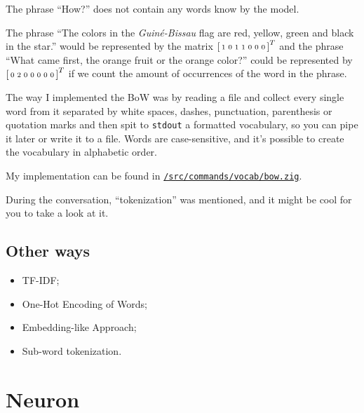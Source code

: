 \documentclass[a4paper,12pt]{article}
\theoremstyle{mytheoremstyle}
\theoremstyle{mytheoremstyle}
\theoremstyle{myproblemstyle}
\begin{document}
    The phrase ``How?'' does not contain any words know by the model.

    The phrase ``The colors in the \textit{Guiné-Bissau} flag are red, yellow,
    green and black in the star.'' would be represented by the matrix
    $\begin{bsmallmatrix}1&0&1&1&0&0&0\end{bsmallmatrix}^T$ and the phrase
    ``What came first, the orange fruit or the orange color?'' could be
    represented by $\begin{bsmallmatrix}0&2&0&0&0&0&0\end{bsmallmatrix}^T$ if
    we count the amount of occurrences of the word in the phrase.

    The way I implemented the BoW was by reading a file and collect every
    single word from it separated by white spaces, dashes, punctuation,
    parenthesis or quotation marks and then spit to \texttt{stdout} a formatted
    vocabulary, so you can pipe it later or write it to a file. Words are
    case-sensitive, and it's possible to create the vocabulary in alphabetic
    order.

    My implementation can be found in
    \href{run:../src/commands/vocab/bow.zig}{\texttt{/src/commands/vocab/bow.zig}}.

    During the conversation, ``tokenization'' was mentioned, and it might be
    cool for you to take a look at it.

    \subsection{Other ways}

    \begin{itemize}
        \item TF-IDF;
        \item One-Hot Encoding of Words;
        \item Embedding-like Approach;
        \item Sub-word tokenization.
    \end{itemize}

    \section{Neuron}
\end{document}
